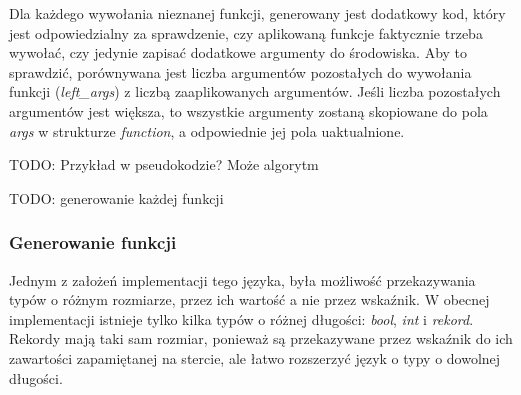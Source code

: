 \documentclass[declaration,shortabstract]{iithesis}
\begin{document}
Dla każdego wywołania nieznanej funkcji, generowany jest dodatkowy \newline
kod, który jest odpowiedzialny za sprawdzenie, czy aplikowaną funkcje 
faktycznie trzeba wywołać, czy jedynie zapisać dodatkowe argumenty do 
środowiska. Aby to sprawdzić, porównywana jest liczba argumentów pozostałych do 
wywołania funkcji (\textit{left\_args}) z liczbą zaaplikowanych argumentów.
Jeśli liczba pozostałych argumentów jest większa, to wszystkie argumenty 
zostaną skopiowane do pola \textit{args} w strukturze \textit{function}, a 
odpowiednie jej pola uaktualnione.


TODO: Przykład w pseudokodzie? Może algorytm


TODO: generowanie każdej funkcji






\subsubsection{Generowanie funkcji}

Jednym z założeń implementacji tego języka, była możliwość przekazywania typów
o różnym rozmiarze, przez ich wartość a nie przez wskaźnik. W obecnej 
implementacji istnieje tylko kilka typów o różnej długości: \textit{bool},
\textit{int} i \textit{rekord}. Rekordy mają taki sam rozmiar, ponieważ są 
przekazywane przez wskaźnik do ich zawartości zapamiętanej na stercie, ale 
łatwo rozszerzyć język o typy o dowolnej długości. 
\end{document}
